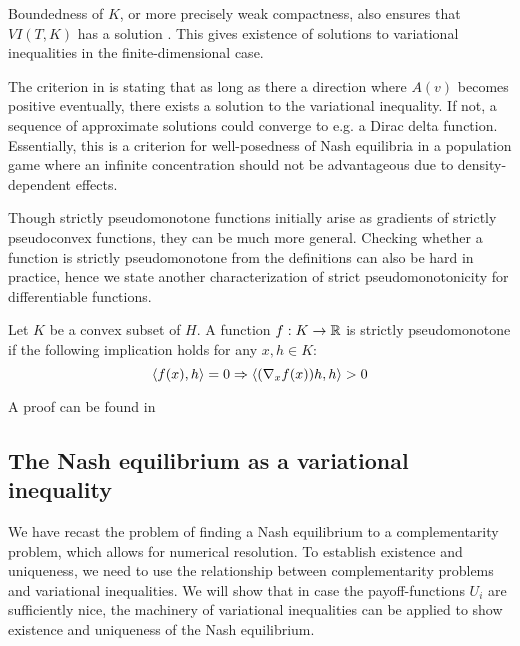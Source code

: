 \begin{remark}
  \label{rem:weak_compact}
  Boundedness of $K$, or more precisely weak compactness, also ensures that $VI(T,K)$ has a solution \citep[Theorem 12.1, P. 510]{hadjisavvas2006handbook}. This gives  existence of solutions to variational inequalities in the finite-dimensional case.

  The criterion in  is stating that as long as there a direction where $A(v)$ becomes positive eventually, there exists a solution to the variational inequality. If not, a sequence of approximate solutions could converge to e.g. a Dirac delta function. Essentially, this is a criterion for well-posedness of Nash equilibria in a population game where an infinite concentration should not be advantageous due to density-dependent effects.
\end{remark}
Though strictly pseudomonotone functions initially arise as gradients of strictly pseudoconvex functions, they can be much more general. Checking whether a function is strictly pseudomonotone from the definitions can also be hard in practice, hence we state another characterization of strict pseudomonotonicity for differentiable functions.
  \begin{lemma}
  \label{lem:strict_pm}
  Let $K$ be a convex subset of $H$. A function $f: K \to \mathbb{R}$ is strictly pseudomonotone if the following implication holds for any $x,h \in K$:
  \begin{equation}
    \left \langle f(x),h \right \rangle = 0 \Rightarrow \left \langle (\nabla_x f(x))h,h \right \rangle > 0
  \end{equation}
\end{lemma}
A proof can be found in \citep[Proposition 2.8, p.96]{hadjisavvas2006handbook}


\subsection{The Nash equilibrium as a variational inequality}
We have recast the problem of finding a Nash equilibrium to a complementarity problem, which allows for numerical resolution. To establish existence and uniqueness, we need to use the relationship between complementarity problems and variational inequalities. We will show that in case the payoff-functions $U_i $ are sufficiently nice, the machinery of variational inequalities can be applied to show existence and uniqueness of the Nash equilibrium.

